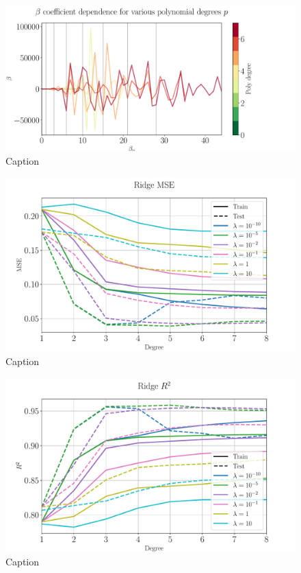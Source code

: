 \documentclass[%
reprint,
amsmath,amssymb,
aps,
pra,
]{revtex4-2}
\begin{document}
\begin{figure}[ht!]
\centering
\includegraphics[width=\linewidth]{Python/Figures/OLS-beta-degree.pdf}
\caption{Caption}
\label{fig:OLS_beta_degree}
\end{figure}
\begin{figure}[ht!]
	\centering
	\includegraphics[width=\linewidth]{Python/Figures/Ridge-MSE-degree.pdf}
	\caption{Caption}
	\label{fig:ridge_mse_degree}
\end{figure}
\begin{figure}[ht!]
	\centering
	\includegraphics[width=\linewidth]{Python/Figures/Ridge-R2-degree.pdf}
	\caption{Caption}
	\label{fig:ridge_r2_degree}
\end{figure}
\end{document}
